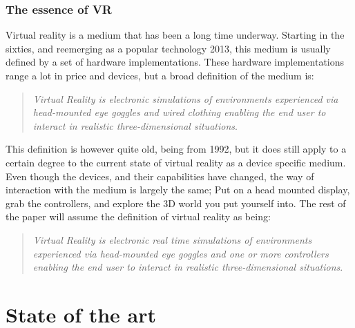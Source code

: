 \subsubsection{The essence of VR}
Virtual reality is a medium\cite{definingVirtualReality} that has been a long time underway. Starting in the sixties, and reemerging as a popular technology 2013, this medium is usually defined by a set of hardware implementations. These hardware implementations range a lot in price and devices, but a broad definition of the medium is:\\

\begin{quote}
	\textit{Virtual Reality is electronic simulations of environments experienced via head-mounted eye goggles and wired clothing enabling the end user to interact in realistic three-dimensional situations}\cite{coates1992}.\\
\end{quote}

This definition is however quite old, being from 1992, but it does still apply to a certain degree to the current state of virtual reality as a device specific medium. Even though the devices, and their capabilities have changed, the way of interaction with the medium is largely the same; Put on a head mounted display, grab the controllers, and explore the 3D world you put yourself into. The rest of the paper will assume the definition of virtual reality as being:\\
\begin{quote}
	\textit{Virtual Reality is electronic real time simulations of environments experienced via head-mounted eye goggles and one or more controllers enabling the end user to interact in realistic three-dimensional situations}\label{def:virtualRealityDefinition}.\\
\end{quote}

\section{State of the art}\label{sec:SOTA}

